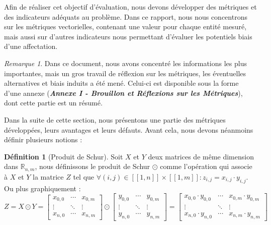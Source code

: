 \documentclass{rapport}
\theoremstyle{definition}
\newtheorem{definition}{Définition}
\theoremstyle{remark}
\theoremstyle{plain}
\theoremstyle{definition}
\theoremstyle{remark}
\newtheorem{remark}{Remarque}
\newcommand{\llbracket}{[\![}
\newcommand{\rrbracket}{]\!]}
\begin{document}
Afin de réaliser cet objectif d'évaluation, nous devons développer des métriques et des indicateurs adéquats au problème.
Dans ce rapport, nous nous concentrons sur les métriques vectorielles, contenant une valeur pour chaque entité mesuré, mais aussi sur d'autres indicateurs nous permettant d'évaluer les potentiels biais d'une affectation.

\begin{remark}
    Dans ce document, nous avons concentré les informations les plus importantes, mais un gros travail de réflexion sur les métriques, les éventuelles alternatives et biais induits a été mené. Celui-ci est disponible sous la forme d'une annexe (\textbf{\textit{Annexe I - Brouillon et Réflexions sur les Métriques}}), dont cette partie est un résumé.
\end{remark}

Dans la suite de cette section, nous présentons une partie des métriques développées, leurs avantages et leurs défauts.
Avant cela, nous devons néanmoins définir plusieurs notions :

\begin{definition}[Produit de Schur]
    Soit $X$ et $Y$ deux matrices de même dimension dans $\mathbb{R}_{n,m}$, nous définissons le produit de Schur $\odot$
    comme l'opération qui associe à $X$ et $Y$ la matrice $Z$ tel que $\forall (i,j)\in\llbracket 1,n\rrbracket\times\llbracket 1,m\rrbracket:z_{i,j}=x_{i,j}\cdot y_{i,j}$. Ou plus graphiquement :
    $$
    Z = X\odot Y = \begin{bmatrix}
        x_{0,0} & \cdots & x_{0,m} \\
        \vdots & \ddots & \vdots \\
        x_{n,0} & \cdots & x_{n,m}
    \end{bmatrix} \odot \begin{bmatrix}
        y_{0,0} & \cdots & y_{0,m} \\
        \vdots & \ddots & \vdots \\
        y_{n,0} & \cdots & y_{n,m}
    \end{bmatrix} = \begin{bmatrix}
        x_{0,0}\cdot y_{0,0} & \cdots & x_{0,m}\cdot y_{0,m} \\
        \vdots & \ddots & \vdots \\
        x_{n,0}\cdot y_{n,0} & \cdots & x_{n,m}\cdot y_{n,m}
    \end{bmatrix}
    $$
\end{definition}
\end{document}
